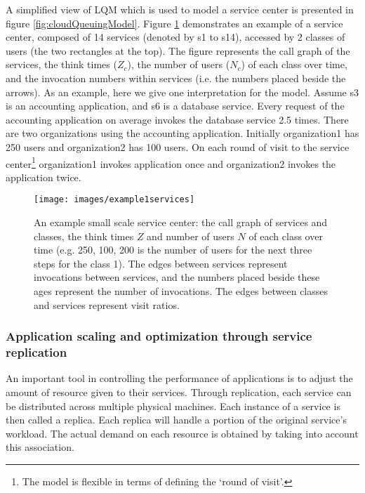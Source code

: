 \documentclass[11pt]{article}
\begin{document}
A simplified view of LQM which is used to model a service center is presented in figure \ref{fig:cloudQueuingModel}. Figure \ref{fig:service_call_graph} demonstrates an example of a service center, composed of 14 services (denoted by s1 to s14), accessed by 2 classes of users (the two rectangles at the top). The figure represents the call graph of the services, the think times ($Z_c$), the number of users ($N_c$) of each class over time, and the invocation numbers within services (i.e. the numbers placed beside the arrows). 
As an example, here we give one interpretation for the model.
Assume s3 is an accounting application, and s6 is a database service.
Every request of the accounting application on average invokes the database service 2.5 times.
There are two organizations using the accounting application. Initially organization1 has 250 users and organization2 has 100 users. On each round of visit to the service center\footnote{The model is flexible in terms of defining the `round of visit'.} organization1 invokes application once and organization2 invokes the application twice. 
	\begin{figure}[htbp]
\begin{center}
 \texttt{[image: images/example1services]}
\caption[An example small scale service center]{An example small scale service center: the call graph of services and classes, the think times $Z$ and number of users $N$ of each class over time (e.g. 250, 100, 200 is the number of users for the next three steps for the class 1). The edges between services represent invocations between services, and the numbers placed beside these ages represent the number of invocations. The edges between classes and services represent visit ratios. }
\label{fig:service_call_graph}
\end{center}
\end{figure}

	 \subsubsection{Application scaling and optimization through service replication} 
	An important tool in controlling the performance of applications is to adjust the amount of resource given to their services.
	Through replication, each service can be distributed across multiple physical machines. Each instance of a service is then called a replica. Each replica will handle a portion of the original service's workload.  The actual demand on each resource is obtained by taking into account this association.
	
\end{document}
